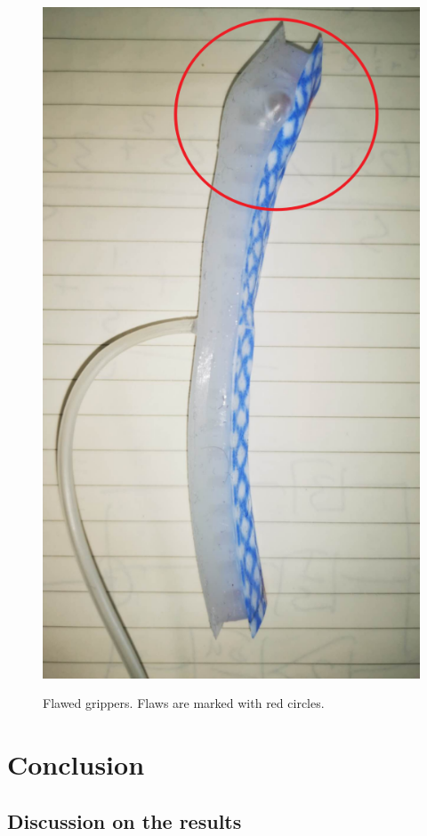 \documentclass[conference]{IEEEtran}
\begin{document}
\begin{figure}[htbp]
\begin{minipage}[t]{0.48\linewidth}
\includegraphics[width=0.8\linewidth]{pics/Section3/notattached.png}
\label{fig:notattached}
\end{minipage}
\caption{Flawed grippers. Flaws are marked with red circles.}
\label{fig:flawed}
\end{figure}




\section{Conclusion}

\label{DiscussionAnConclusion}

\subsection{Discussion on the results}
\end{document}
